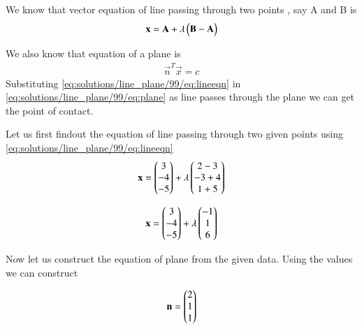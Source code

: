 We know that vector equation of line passing through two points , say A and B is
\begin{align}
\mathbf{x} = \mathbf{A}+\lambda\begin{pmatrix}\mathbf{B}-\mathbf{A}\end{pmatrix}\label{eq:solutions/line_plane/99/eq:lineeqn}
\end{align}

We also know that equation of a plane is 
\begin{align}
\vec{n}^T\vec{x}=c\label{eq:solutions/line_plane/99/eq:plane}
\end{align}
Substituting \eqref{eq:solutions/line_plane/99/eq:lineeqn} in \eqref{eq:solutions/line_plane/99/eq:plane} as line passes through the plane we can get the point of contact.


Let us first findout the equation of line passing through two given points using \eqref{eq:solutions/line_plane/99/eq:lineeqn}
\begin{align}
\mathbf{x}=\begin{pmatrix}3 \\-4 \\-5\end{pmatrix}+\lambda 
\begin{pmatrix}2-3 \\-3+4 \\1+5\end{pmatrix}
\end{align}

\begin{align}
\mathbf{x}=\begin{pmatrix}3 \\-4 \\-5\end{pmatrix}+\lambda 
\begin{pmatrix}-1 \\1 \\6\end{pmatrix}\label{eq:solutions/line_plane/99/eq:lineval}
\end{align}


Now let us construct the equation of plane from the given data.
Using the values we can construct 

\begin{align}
\mathbf{n}=\begin{pmatrix} 2\\ 1\\1\end{pmatrix}\label{eq:solutions/line_plane/99/eq:normal}
\end{align}


